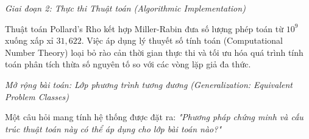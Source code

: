 \documentclass{article}
\begin{document}
\vspace{0.5em}\noindent\emph{Giai đoạn 2: Thực thi Thuật toán (Algorithmic Implementation)}


Thuật toán Pollard's Rho kết hợp Miller-Rabin đưa số lượng phép toán từ $10^9$ xuống xấp xỉ $31,622$. Việc áp dụng lý thuyết số tính toán (Computational Number Theory) loại bỏ rào cản thời gian thực thi và tối ưu hóa quá trình tính toán phân tích thừa số nguyên tố so với các vòng lặp giả đa thức.


\vspace{0.5em}\noindent\textit{Mở rộng bài toán: Lớp phương trình tương đương (Generalization: Equivalent Problem Classes)}

Một câu hỏi mang tính hệ thống được đặt ra: \textit{"Phương pháp chứng minh và cấu trúc thuật toán này có thể áp dụng cho lớp bài toán nào?"}
\end{document}
